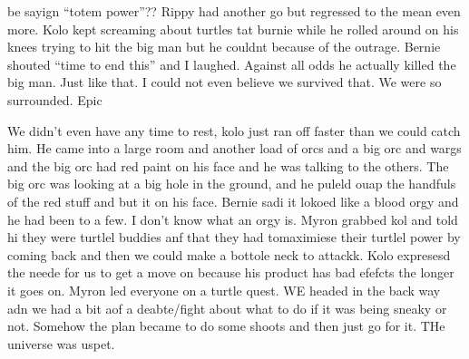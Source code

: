 \begin{multicols}{2}
be sayign “totem power”?? Rippy had another go but regressed to the mean even more. Kolo kept screaming about turtles tat burnie while he rolled around on his knees trying to hit the big man but he couldnt because of the outrage. Bernie shouted “time to end this” and I laughed. Against all odds he actually killed the big man. Just like that. I could not even believe we survived that. We were so surrounded. Epic\medskip

We didn’t even have any time to rest, kolo just ran off faster than we could catch him. He came into a large room and another load of orcs and a big orc and wargs and the big orc had red paint on his face and he was talking to the others. The big orc was looking at a big hole in the ground, and he puleld ouap the handfuls of the red stuff and but it on his face. Bernie sadi it lokoed like a blood orgy and he had been to a few. I don’t know what an orgy is. Myron grabbed kol and told hi they were turtlel buddies anf that they had tomaximiese their turtlel power by coming back and then we could make a bottole neck to attackk. Kolo expresesd the neede for us to get a move on because his product has bad efefcts the longer it goes on. Myron led everyone on a turtle quest. WE headed in the back way adn we had a bit aof a deabte/fight about what to do if it was being sneaky or not. Somehow the plan became to do some shoots and then just go for it. THe universe was uspet.\medskip


\end{multicols}
